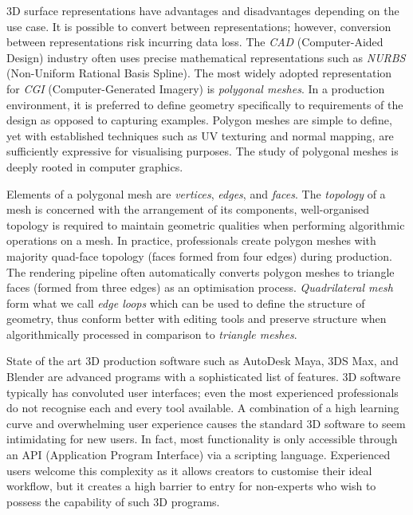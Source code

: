 \documentclass[ %
author={Dillon Keith Diep},
supervisor={Dr. Carl Henrik Ek},
degree={MEng},
title={ART-CG Hair:},
subtitle={Assisted Real-time Content Generation of Stylised Virtual Hair},
type={Research},
year={2017} ]{dissertation}
\begin{document}
3D surface representations have advantages and disadvantages depending on the use case. It is possible to convert between representations; however, conversion between representations risk incurring data loss. The \textit{CAD} (Computer-Aided Design) industry often uses precise mathematical representations such as \textit{NURBS} (Non-Uniform Rational Basis Spline). The most widely adopted representation for \textit{CGI} (Computer-Generated Imagery) is \textit{polygonal meshes}. In a production environment, it is preferred to define geometry specifically to requirements of the design as opposed to capturing examples. Polygon meshes are simple to define, yet with established techniques such as UV texturing and normal mapping, are sufficiently expressive for visualising purposes. The study of polygonal meshes is deeply rooted in computer graphics.

Elements of a polygonal mesh are \textit{vertices}, \textit{edges}, and \textit{faces}. The \textit{topology} of a mesh is concerned with the arrangement of its components, well-organised topology is required to maintain geometric qualities when performing algorithmic operations on a mesh. In practice, professionals create polygon meshes with majority quad-face topology (faces formed from four edges) during production. The rendering pipeline often automatically converts polygon meshes to triangle faces (formed from three edges) as an optimisation process. \textit{Quadrilateral mesh} form what we call \textit{edge loops} which can be used to define the structure of geometry, thus conform better with editing tools and preserve structure when algorithmically processed in comparison to \textit{triangle meshes}.

State of the art 3D production software such as AutoDesk Maya, 3DS Max, and Blender are advanced programs with a sophisticated list of features. 3D software typically has convoluted user interfaces; even the most experienced professionals do not recognise each and every tool available. A combination of a high learning curve and overwhelming user experience causes the standard 3D software to seem intimidating for new users. In fact, most functionality is only accessible through an API (Application Program Interface) via a scripting language.  Experienced users welcome this complexity as it allows creators to customise their ideal workflow, but it creates a high barrier to entry for non-experts who wish to possess the capability of such 3D programs.

\end{document}
